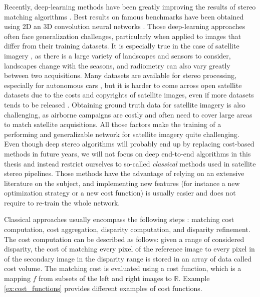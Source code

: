 Recently, deep-learning methods have been greatly improving the results of stereo matching algorithms \cite{laga_survey_2022}. Best results on famous benchmarks have been obtained using 2D an 3D convolution neural networks \cite{guo_openstereo_2024, liu_playing_2024}. Those deep-learning approaches often face generalization challenges, particularly when applied to images that differ from their training datasets. It is especially true in the case of satellite imagery \cite{mari_disparity_2022, jiang_rethinking_2024}, as there is a large variety of landscapes and sensors to consider, landscapes change with the seasons, and radiometry can also vary greatly between two acquisitions. Many datasets are available for stereo processing, especially for autonomous cars \cite{geiger_are_2012, geiger_vision_2013}, but it is harder to come across open satellite datasets due to the costs and copyrights of satellite images, even if more datasets tends to be released \cite{bosch_semantic_2018, le_saux_data_2019, huang_urban_2022}. Obtaining ground truth data for satellite imagery is also challenging, as airborne campaigns are costly and often need to cover large areas to match satellite acquisitions. All those factors make the training of a performing and generalizable network for satellite imagery quite challenging. Even though deep stereo algorithms will probably end up by replacing cost-based methods in future years, we will not focus on deep end-to-end algorithms in this thesis and instead restrict ourselves to so-called \textit{classical} methods used in satellite stereo pipelines. Those methods have the advantage of relying on an extensive literature on the subject, and implementing new features (for instance a new optimization strategy or a new cost function) is usually easier and does not require to re-train the whole network.

Classical approaches usually encompass the following steps \cite{scharstein_taxonomy_2001}: matching cost computation, cost aggregation, disparity computation, and disparity refinement. The cost computation can be described as follows: given a range of considered disparity, the cost of matching every pixel of the reference image to every pixel in of the secondary image in the disparity range is stored in an array of data called cost volume. The matching cost is evaluated using a cost function, which is a mapping $f$ from subsets of the left and right images to $\mathbb{R}$. Example \ref{ex:cost_functions} provides different examples of cost functions.

